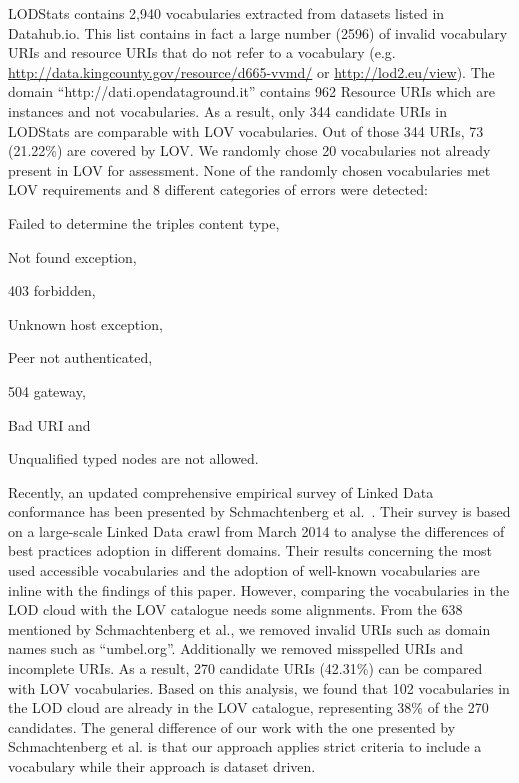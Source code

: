 \documentclass{iosart2c}
\begin{document}
 
LODStats contains 2,940 vocabularies extracted from datasets listed in Datahub.io. This list contains in fact a large number (2596) of invalid vocabulary URIs and resource URIs that do not refer to a vocabulary (e.g. {\footnotesize\url{http://data.kingcounty.gov/resource/d665-vvmd/}} or {\footnotesize\url{http://lod2.eu/view}}). The domain ``http://dati.opendataground.it'' contains 962 Resource URIs which are instances and not vocabularies. As a result, only 344 candidate URIs in LODStats are comparable with LOV vocabularies. Out of those 344 URIs, 73 (21.22\%) are covered by LOV. We randomly chose 20 vocabularies not already present in LOV for assessment. None of the randomly chosen vocabularies met LOV requirements and 8 different categories of errors were detected: 
\begin{inparaenum}[1)]
\item Failed to determine the triples content type,
\item  Not found exception, 
\item 403 forbidden, 
\item Unknown host exception, 
\item  Peer not authenticated,
\item 504 gateway,
\item Bad URI and
\item  Unqualified typed nodes are not allowed. 
\end{inparaenum}

Recently, an updated comprehensive empirical survey of Linked Data conformance has been presented by Schmachtenberg et al.~\cite{max2014}. Their survey is based on a large-scale Linked Data crawl from March 2014 to analyse the differences of best practices adoption in different domains. Their results concerning the most used accessible vocabularies and the adoption of well-known vocabularies are inline with the findings of this paper. However, comparing the vocabularies in the LOD cloud with the LOV catalogue needs some alignments. From the 638 mentioned by Schmachtenberg et al., we removed invalid URIs such as domain names such as ``umbel.org''. Additionally we removed misspelled URIs and incomplete URIs. As a result, 270 candidate URIs (42.31\%) can be compared with LOV vocabularies. Based on this analysis, we found that 102 vocabularies in the LOD cloud are already in the LOV catalogue, representing 38\% of the 270 candidates. The general difference of our work with the one presented by Schmachtenberg et al. is that our approach applies strict criteria to include a vocabulary while their approach is dataset driven.
\end{document}
